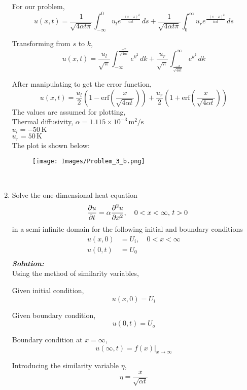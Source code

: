 \documentclass[]{article}
\theoremstyle{definition}
\begin{document}
\begin{enumerate}
For our problem,
\[
u(x,t) = \frac{1}{\sqrt{4\alpha t \pi}} \int_{-\infty}^{0} u_l e^{\frac{-(s-x)^2}{4\alpha t}}\,ds + \frac{1}{\sqrt{4\alpha t \pi}} \int_{0}^{\infty} u_r e^{\frac{-(s-x)^2}{4\alpha t}}\,ds
\]

Transforming from \(s\) to \(k\),
\[
u(x,t) = \frac{u_l}{\sqrt{\pi}} \int_{-\infty}^{\frac{-x}{\sqrt{4\alpha t}}} e^{k^2}\,dk + \frac{u_r}{\sqrt{\pi}} \int_{\frac{-x}{\sqrt{4\alpha t}}}^{\infty} e^{k^2}\,dk
\]

After manipulating to get the error function,
\[
\boxed{
u(x,t) = \frac{u_l}{2} \left(1 - \text{erf}\left(\frac{x}{\sqrt{4 \alpha t}}\right)\right) + \frac{u_r}{2} \left(1 + \text{erf}\left(\frac{x}{\sqrt{4 \alpha t}}\right)\right)
}
\]
The values are assumed for plotting, \\
Thermal diffusivity, $\alpha = 1.115 \times 10^{-3}\, \text{m}^2/\text{s}$ \\
$u_l = -50\, \text{K}$ \\
$u_r = 50\, \text{K}$ \\
The plot is shown below:\\
\begin{figure}[htbp]
    \centering
    \texttt{[image: Images/Problem\_3\_b.png]}
\end{figure}\\
\newpage
\item 
Solve the one-dimensional heat equation
\[
\quad \frac{\partial u}{\partial t} = \alpha \frac{\partial^2 u}{\partial x^2}, \quad 0 < x < \infty, \, t > 0 \\
\]
in a semi-infinite domain for the following initial and boundary conditions\\
\begin{align*}
u(x,0) &= U_i, \quad 0 < x < \infty \\
u(0,t) &= U_0\\
\end{align*}
\emph{\textbf{Solution:}}\\
Using the method of similarity variables,

Given initial condition,
\[
u(x,0) = U_i
\]

Given boundary condition,
\[
u(0,t) = U_o
\]

Boundary condition at \(x = \infty\),
\[
u(\infty,t) = f(x)|_{{x \to \infty}}
\]

Introducing the similarity variable \(\eta\),
\[
\eta = \frac{x}{\sqrt{\alpha t}}
\]


\end{enumerate}
\end{document}

